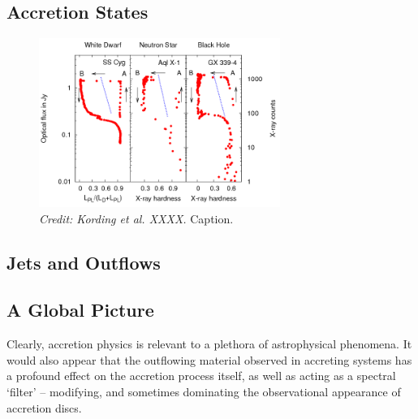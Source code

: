 \subsection{Accretion States}


\begin{figure}
\centering
\includegraphics[width=0.7\textwidth]{figures/02-accretion/kording_hid.png}
\caption
{
{\sl Credit: Kording et al. XXXX.} 
Caption.
} 
\label{fig:kording_hid}
\end{figure}



\subsection{Jets and Outflows}


\subsection{A Global Picture}

Clearly, accretion physics is relevant to a plethora of astrophysical phenomena. 
It would also appear that the outflowing material observed in accreting systems 
has a profound effect on the accretion process itself, as well as acting 
as a spectral `filter' -- modifying, and sometimes dominating the observational 
appearance of accretion discs.

